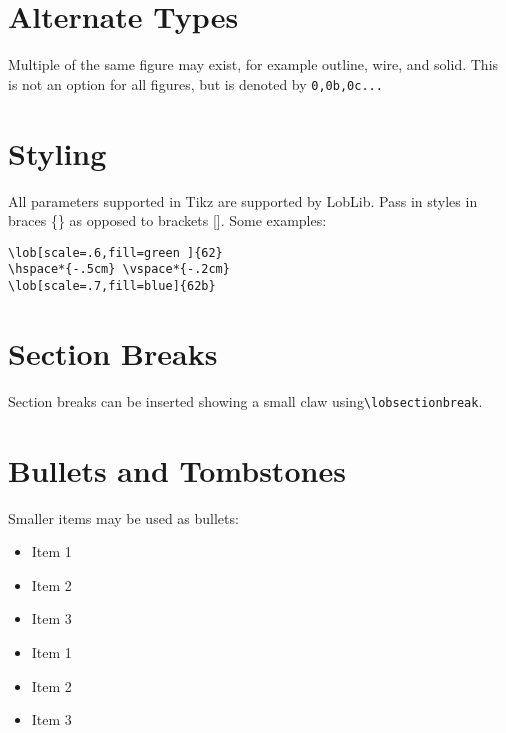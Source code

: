 \documentclass[11pt]{article}
\begin{document}
\section*{Alternate Types}
Multiple of the same figure may exist, for example outline, wire, and solid. This is not an option for all figures, but is denoted by \texttt{0,0b,0c...}\\

\vspace*{1em}




\pagebreak

\section*{Styling}
All parameters supported in Tikz are supported by LobLib. Pass in styles in braces \{\} as opposed to brackets []. Some examples:
\vspace*{1cm}

\begin{multicols}{2}
\begin{verbatim}
\lob[scale=.6,fill=green ]{62}   
\hspace*{-.5cm} \vspace*{-.2cm}
\lob[scale=.7,fill=blue]{62b}
\end{verbatim}

\hspace*{-.5cm} \vspace*{-.2cm} 
\end{multicols}

\section*{Section Breaks}
Section breaks can be inserted showing a small claw using\texttt{\textbackslash lobsectionbreak}.

\lobsectionbreak

\section*{Bullets and Tombstones}
Smaller items may be used as bullets:

\begin{multicols}{2} 
\begin{itemize}
\item[\lobclaw{simple}] Item 1
\item[\lobclaw{simple}] Item 2
\item[\lobclaw{simple}] Item 3
\end{itemize}

\begin{itemize}
\item[\lob{29}] Item 1
\item[\lob{29}] Item 2
\item[\lob{29}] Item 3
\end{itemize}
\end{multicols} 
\end{document}
